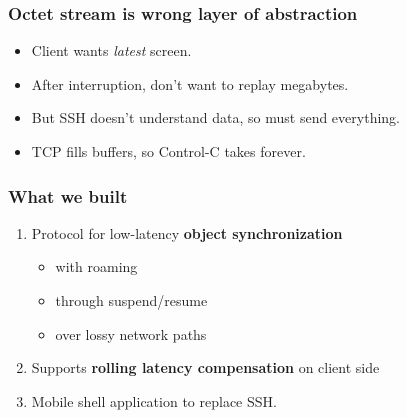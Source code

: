 \documentclass[svgnames]{beamer}
\begin{document}
\begin{frame}

\frametitle{Octet stream is wrong layer of abstraction}

\begin{itemize}
\item Client wants \emph{latest} screen.
\item After interruption, don't want to replay megabytes.
\item But SSH doesn't understand data, so must send everything.
\item TCP fills buffers, so Control-C takes forever.
\end{itemize}

\end{frame}

\begin{frame}

\frametitle{What we built}

\begin{enumerate}

\item Protocol for low-latency \textbf{object synchronization}

\begin{itemize}
\item with roaming
\item through suspend/resume
\item over lossy network paths
\end{itemize}

\item Supports \textbf{rolling latency compensation} on client side

\item Mobile shell application to replace SSH.

\end{enumerate}

\end{frame}
\end{document}
